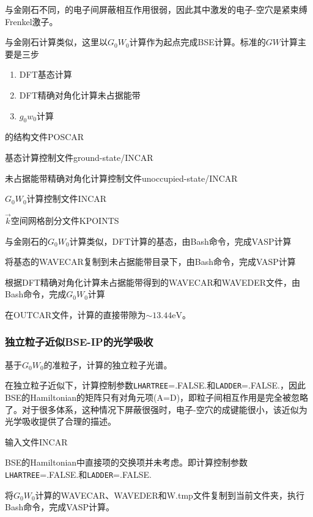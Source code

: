 与金刚石不同，的电子间屏蔽相互作用很弱，因此其中激发的电子-空穴是紧束缚\textrm{Frenkel}激子。

与金刚石计算类似，这里以$G_0W_0$计算作为起点完成\textrm{BSE}计算。标准的$GW$计算主要是三步
\begin{enumerate}
	\item \textrm{DFT}基态计算
	\item \textrm{DFT}精确对角化计算未占据能带
	\item $g_0w_0$计算
\end{enumerate}

的结构文件\textrm{POSCAR}

基态计算控制文件\textrm{ground-state/INCAR}

未占据能带精确对角化计算控制文件\textrm{unoccupied-state/INCAR}

$G_0W_0$计算控制文件\textrm{INCAR}

$\vec k$空间网格剖分文件\textrm{KPOINTS}

与金刚石的$G_0W_0$计算类似，\textrm{DFT}计算的基态，由\textrm{Bash}命令，完成\textrm{VASP}计算

将基态的\textrm{WAVECAR}复制到未占据能带目录下，由\textrm{Bash}命令，完成\textrm{VASP}计算

根据\textrm{DFT}精确对角化计算未占据能带得到的\textrm{WAVECAR}和\textrm{WAVEDER}文件，由\textrm{Bash}命令，完成$G_0W_0$计算

在\textrm{OUTCAR}文件，计算的直接带隙为$\sim13.44\mathrm{eV}$。

\subsubsection{独立粒子近似\rm{BSE-IP}的光学吸收}
基于$G_0W_0$的准粒子，计算的独立粒子光谱。

在独立粒子近似下，计算控制参数\texttt{LHARTREE}=\textrm{.FALSE.}和\texttt{LADDER}=\textrm{.FALSE.}，因此\textrm{BSE}的\textrm{Hamiltonian}的矩阵只有对角元项\textrm{(A=D)}，即粒子间相互作用是完全被忽略了。对于很多体系，这种情况下屏蔽很强时，电子-空穴的成键能很小，该近似为光学吸收提供了合理的描述。

输入文件\textrm{INCAR}

\textrm{BSE}的\textrm{Hamiltonian}中直接项的交换项并未考虑。即计算控制参数\texttt{LHARTREE}=\textrm{.FALSE.}和\texttt{LADDER}=\textrm{.FALSE.}

将$G_0W_0$计算的\textrm{WAVECAR}、\textrm{WAVEDER}和\textrm{W.tmp}文件复制到当前文件夹，执行\textrm{Bash}命令，完成\textrm{VASP}计算。

